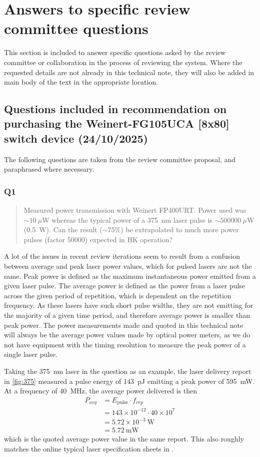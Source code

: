 \documentclass[a4paper,11pt]{article}
\let\oldsim\sim
\renewcommand{\sim}{{\oldsim}}
\begin{document}
\clearpage
\newpage

\section{Answers to specific review committee questions}
This section is included to answer specific questions asked by the review committee or collaboration in the process of reviewing the system. Where the requested details are not already in this technical note, they will also be added in main body of the text in the appropriate location.

\subsection{Questions included in recommendation on purchasing the Weinert-FG105UCA [8x80] switch device (24/10/2025)}

The following questions are taken from the review committee proposal, and paraphrased where necessary.

\subsubsection{Q1}
 \begin{quote}
Measured power transmission with Weinert FP400URT. Power used was $\sim10~\mu$W whereas the typical power of a 375~nm laser pulse is $\sim500000~\mu$W (0.5~W). Can the result ($\sim75\%$) be extrapolated to much more power pulses (factor 50000) expected in HK operation?
 \end{quote}
A lot of the issues in recent review iterations seem to result from a confusion between average and peak laser power values, which for pulsed lasers are not the same. Peak power is defined as the maximum instantaneous power emitted from a given laser pulse. The average power is defined as the power from a laser pulse across the given period of repetition, which is dependent on the repetition frequency. As these lasers have such short pulse widths, they are not emitting for the majority of a given time period, and therefore average power is smaller than peak power. The power measurements made and quoted in this technical note will always be the average power values made by optical power meters, as we do not have equipment with the timing resolution to measure the peak power of a single laser pulse.

Taking the 375~nm laser in the question as an example, the laser delivery report in \cref{fig:375} measured a pulse energy of 143~pJ emitting a peak power of 595~mW. At a frequency of 40~MHz, the average power delivered is then
\begin{align*}
    P_{avg} &= E_\text{pulse} \cdot f_{rep} \\
            &= 143\times10^{-12} \cdot 40\times10^7 \\
            &= 5.72\times10^{-3}~\text{W} \\
            &= 5.72~\text{mW}
\end{align*}
which is the quoted average power value in the same report. This also roughly matches the online typical laser specification sheets in \cite{bib:laserhead}.
\end{document}
